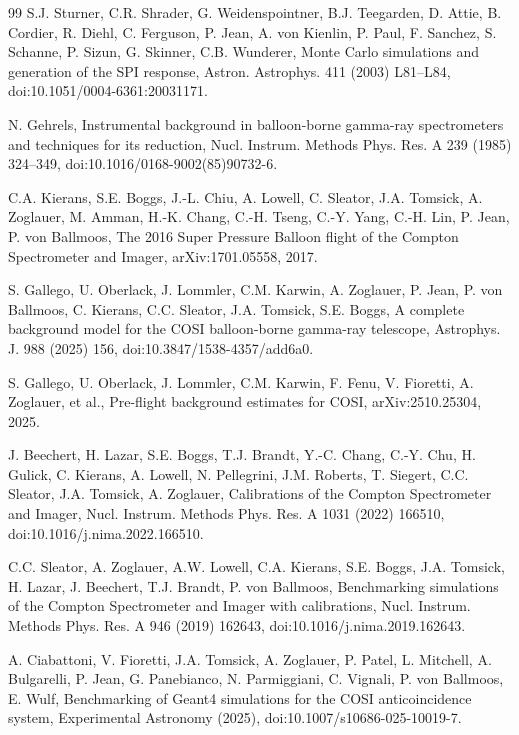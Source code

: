 \documentclass[11pt]{article}
\begin{document}
\begin{thebibliography}{99}
S.J. Sturner, C.R. Shrader, G. Weidenspointner, B.J. Teegarden, D. Attie, B. Cordier, R. Diehl, C. Ferguson, P. Jean, A. von Kienlin, P. Paul, F. Sanchez, S. Schanne, P. Sizun, G. Skinner, C.B. Wunderer, Monte Carlo simulations and generation of the SPI response, Astron. Astrophys. 411 (2003) L81--L84, doi:10.1051/0004-6361:20031171.

N. Gehrels, Instrumental background in balloon-borne gamma-ray spectrometers and techniques for its reduction, Nucl. Instrum. Methods Phys. Res. A 239 (1985) 324--349, doi:10.1016/0168-9002(85)90732-6.

C.A. Kierans, S.E. Boggs, J.-L. Chiu, A. Lowell, C. Sleator, J.A. Tomsick, A. Zoglauer, M. Amman, H.-K. Chang, C.-H. Tseng, C.-Y. Yang, C.-H. Lin, P. Jean, P. von Ballmoos, The 2016 Super Pressure Balloon flight of the Compton Spectrometer and Imager, arXiv:1701.05558, 2017.

S. Gallego, U. Oberlack, J. Lommler, C.M. Karwin, A. Zoglauer, P. Jean, P. von Ballmoos, C. Kierans, C.C. Sleator, J.A. Tomsick, S.E. Boggs, A complete background model for the COSI balloon-borne gamma-ray telescope, Astrophys. J. 988 (2025) 156, doi:10.3847/1538-4357/add6a0.

S. Gallego, U. Oberlack, J. Lommler, C.M. Karwin, F. Fenu, V. Fioretti, A. Zoglauer, et al., Pre-flight background estimates for COSI, arXiv:2510.25304, 2025.

J. Beechert, H. Lazar, S.E. Boggs, T.J. Brandt, Y.-C. Chang, C.-Y. Chu, H. Gulick, C. Kierans, A. Lowell, N. Pellegrini, J.M. Roberts, T. Siegert, C.C. Sleator, J.A. Tomsick, A. Zoglauer, Calibrations of the Compton Spectrometer and Imager, Nucl. Instrum. Methods Phys. Res. A 1031 (2022) 166510, doi:10.1016/j.nima.2022.166510.

C.C. Sleator, A. Zoglauer, A.W. Lowell, C.A. Kierans, S.E. Boggs, J.A. Tomsick, H. Lazar, J. Beechert, T.J. Brandt, P. von Ballmoos, Benchmarking simulations of the Compton Spectrometer and Imager with calibrations, Nucl. Instrum. Methods Phys. Res. A 946 (2019) 162643, doi:10.1016/j.nima.2019.162643.

A. Ciabattoni, V. Fioretti, J.A. Tomsick, A. Zoglauer, P. Patel, L. Mitchell, A. Bulgarelli, P. Jean, G. Panebianco, N. Parmiggiani, C. Vignali, P. von Ballmoos, E. Wulf, Benchmarking of Geant4 simulations for the COSI anticoincidence system, Experimental Astronomy (2025), doi:10.1007/s10686-025-10019-7.


\end{thebibliography}
\end{document}
